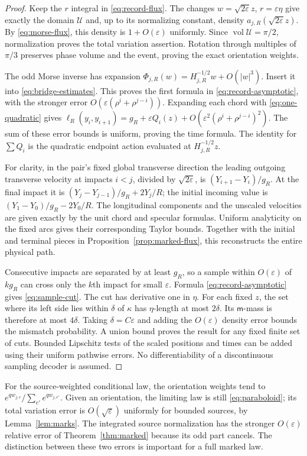 \begin{proof}
Keep the $r$ integral in \eqref{eq:record-flux}. The changes
$w=\sqrt{2\varepsilon}z$, $r=\varepsilon\eta$ give exactly the domain
$\mathcal U$ and, up to its normalizing constant, density
$a_{j,R}(\sqrt{2\varepsilon}z)$. By \eqref{eq:morse-flux}, this density
is $1+O(\varepsilon)$ uniformly. Since
$\operatorname{vol}\mathcal U=\pi/2$, normalization proves the total
variation assertion. Rotation through multiples of $\pi/3$ preserves
phase volume and the event, proving the exact orientation weights.

The odd Morse inverse has expansion
$\Phi_{j,R}(w)=H_{j,R}^{-1/2}w+O(|w|^3)$. Insert it into
\eqref{eq:bridge-estimates}. This proves the first formula in
\eqref{eq:record-asymptotic}, with the stronger error
$O(\varepsilon(\rho^i+\rho^{j-i}))$. Expanding each chord with
\eqref{eq:one-quadratic} gives
$\ell_R(y_i,y_{i+1})=g_R+\varepsilon Q_i(z)
 +O(\varepsilon^2(\rho^i+\rho^{j-i})^2)$.
The sum of these error bounds is uniform, proving the time formula.
The identity for $\sum Q_i$ is the quadratic endpoint action evaluated
at $H_{j,R}^{-1/2}z$.

For clarity, in the pair's fixed global transverse direction the leading
outgoing transverse velocity at impacts $i<j$, divided by
$\sqrt{2\varepsilon}$, is $(Y_{i+1}-Y_i)/g_R$.
At the final impact it is
$(Y_j-Y_{j-1})/g_R+2Y_j/R$; the initial incoming value is
$(Y_1-Y_0)/g_R-2Y_0/R$.
The longitudinal components and the unscaled velocities are given
exactly by the unit chord and specular formulas. Uniform analyticity
on the fixed arcs gives their corresponding Taylor bounds. Together
with the initial and terminal pieces in Proposition~\ref{prop:marked-flux},
this reconstructs the entire physical path.

Consecutive impacts are separated by at least $g_R$, so a sample within
$O(\varepsilon)$ of $kg_R$ can cross only the $k$th impact for small
$\varepsilon$. Formula \eqref{eq:record-asymptotic} gives
\eqref{eq:sample-cut}. The cut has derivative one in $\eta$.
For each fixed $z$, the set where its left side lies within $\delta$
of $\kappa$ has $\eta$-length at most $2\delta$. Its
$\mathsf m$-mass is therefore at most $4\delta$. Taking
$\delta=C\varepsilon$ and adding the $O(\varepsilon)$ density error
bounds the mismatch probability. A union bound proves the result for
any fixed finite set of cuts. Bounded Lipschitz tests of the scaled
positions and times can be added using their uniform pathwise errors.
No differentiability of a discontinuous sampling decoder is assumed.
\end{proof}

For the source-weighted conditional law, the orientation weights tend
to $e^{qw_{j,e}}/\sum_{e'}e^{qw_{j,e'}}$. Given an orientation, the
limiting law is still \eqref{eq:paraboloid}; its total variation error
is $O(\sqrt\varepsilon)$ uniformly for bounded sources, by
Lemma~\ref{lem:marks}. The integrated source normalization has the
stronger $O(\varepsilon)$ relative error of Theorem~\ref{thm:marked}
because its odd part cancels. The distinction between these two errors
is important for a full marked law.

